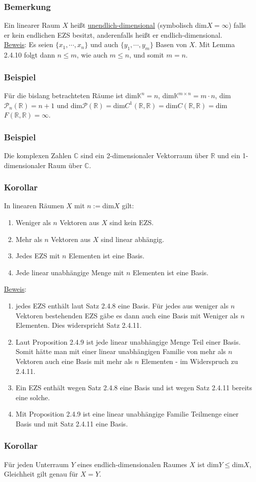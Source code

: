 \subsubsection{Bemerkung}
Ein linearer Raum $X$ heißt \underline{unendlich-dimensional} (symbolisch dim$X=\infty$) falls er kein endlichen EZS besitzt, anderenfalls heißt er endlich-dimensional.\\
\underline{Beweis}: Es seien $\{x_1,\cdots ,x_n\}$ und auch $\{y_1,\cdots ,y_m\}$ Basen von $X$.  Mit Lemma 2.4.10 folgt dann $n\leq m$, wie auch $m\leq n$, und somit $m=n$.
\subsubsection{Beispiel}
Für die bislang betrachteten Räume ist dim$\mathbb{K}^n=n$, dim$\mathbb{K}^{m\times n}=m\cdot n$, dim$\mathcal{P}_n(\mathbb{R})=n+1$ und dim$\mathcal{P}(\mathbb{R})=$dim$C^1(\mathbb{R},\mathbb{R})=$dim$C(\mathbb{R},\mathbb{R})=$dim$F(\mathbb{R},\mathbb{R})=\infty$.
\subsubsection{Beispiel}
Die komplexen Zahlen $\mathbb{C}$ sind ein 2-dimensionaler Vektorraum über $\mathbb{R}$ und ein 1-dimensionaler Raum über $\mathbb{C}$.
\subsubsection{Korollar}
In linearen Räumen $X$ mit $n:=$dim$X$ gilt:
\begin{enumerate}
\item Weniger als $n$ Vektoren aus $X$ sind kein EZS.
\item Mehr als $n$ Vektoren aus $X$ sind linear abhängig.
\item Jedes EZS mit $n$ Elementen ist eine Basis.
\item Jede linear unabhängige Menge mit $n$ Elementen ist eine Basis.
\end{enumerate}
\underline{Beweis}: 
\begin{enumerate}
\item jedes EZS enthält laut Satz 2.4.8 eine Basis.  Für jedes aus weniger als $n$ Vektoren bestehenden EZS gäbe es dann auch eine Basis mit Weniger als $n$ Elementen.  Dies widerspricht Satz 2.4.11.
\item Laut Proposition 2.4.9 ist jede linear unabhängige Menge Teil einer Basis.  Somit hätte man mit einer linear unabhängigen Familie von mehr als $n$ Vektoren auch eine Basis mit mehr als $n$ Elementen - im Widerspruch zu 2.4.11.
\item Ein EZS enthält wegen Satz 2.4.8 eine Basis und ist wegen Satz 2.4.11 bereits eine solche.
\item Mit Proposition 2.4.9 ist eine linear unabhängige Familie Teilmenge einer Basis und mit Satz 2.4.11 eine Basis.
\end{enumerate}
\subsubsection{Korollar}
Für jeden Unterraum $Y$ eines endlich-dimensionalen Raumes $X$ ist dim$Y\leq$dim$X$, Gleichheit gilt genau für $X=Y$.